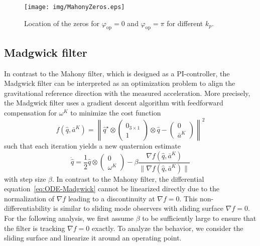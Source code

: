 \begin{figure}[tb]
	\centering
	\texttt{[image: img/MahonyZeros.eps]}
	\caption{Location of the zeros 	for $\varphi_{\mathrm{op}}=0$ and $\varphi_{\mathrm{op}}=\pi$ for different $k_p$.}
	\label{IMG:Ana:ZerosMahony}
\end{figure}

\subsection{Madgwick filter}
In contrast to the Mahony filter, which is designed as a PI-controller, the Madgwick filter can be interpreted as an optimization problem to align the gravitational reference direction with the measured acceleration.
More precisely, the Madgwick filter uses a gradient descent algorithm with feedforward compensation for $\omega^K$ to minimize the cost function 
\begin{equation}
	f(\hat{q}, \bar{a}^K) = \left\|\hat{q} ^\star \otimes \begin{pmatrix}0_{3\times1} \\ 1 \end{pmatrix} \otimes \hat{q} - \begin{pmatrix} 0 \\ \bar{a}^K\end{pmatrix}\right\|^2
\end{equation}
such that each iteration yields a new quaternion estimate~\cite{Madgwick2011,Ludwig2018a}
\begin{equation}\label{eq:ODE-Madgwick}
	\dot{\hat{q}} = \frac{1}{2} \hat{q} \otimes \begin{pmatrix}0 \\ \omega^K \end{pmatrix} -
	\beta \frac{\nabla f(\hat{q}, \bar{a}^K)}{\| \nabla f(\hat{q}, \bar{a}^K)\|}
\end{equation}
with step size $\beta$.
In contrast to the Mahony filter, the differential equation~\eqref{eq:ODE-Madgwick} cannot be linearized directly due to the normalization of $\nabla f$ leading to a discontinuity at $\nabla f = 0$. 
This non-differentiability is similar to sliding mode observers with sliding surface $\nabla f=0$.
For the following analysis, we first assume $\beta$ to be sufficiently large to ensure that the filter is tracking $\nabla f=0$ exactly.
To analyze the behavior, we consider the sliding surface and linearize it around an operating point. 
